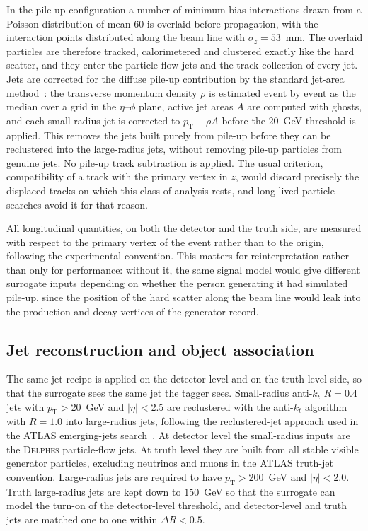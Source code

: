 \documentclass[a4paper,11pt]{article}
\newcommand{\dR}{\Delta R}
\newcommand{\pT}{p_{\mathrm{T}}}
\newcommand{\obshead}[1]{\par\medskip\noindent{\bfseries #1}\par\nobreak\smallskip}
\begin{document}
\obshead{Pile-up}

In the pile-up configuration a number of minimum-bias interactions
drawn from a Poisson distribution of mean $60$ is overlaid before
propagation, with the interaction points distributed along the beam
line with $\sigma_z = 53$~mm. The overlaid particles are therefore
tracked, calorimetered and clustered exactly like the hard scatter,
and they enter the particle-flow jets and the track collection of
every jet. Jets are corrected for the diffuse pile-up contribution by
the standard jet-area method~\cite{Cacciari:2007fd}: the transverse
momentum density $\rho$ is estimated event by event as the median over
a grid in the $\eta$--$\phi$ plane, active jet areas $A$ are computed
with ghosts, and each small-radius jet is corrected to
$\pT - \rho A$ before the $20$~GeV threshold is applied. This removes
the jets built purely from pile-up before they can be reclustered into
the large-radius jets, without removing pile-up particles from genuine
jets. No pile-up track subtraction is applied. The usual criterion,
compatibility of a track with the primary vertex in $z$, would discard
precisely the displaced tracks on which this class of analysis rests,
and long-lived-particle searches avoid it for that reason.

All longitudinal quantities, on both the detector and the truth side,
are measured with respect to the primary vertex of the event rather
than to the origin, following the experimental convention. This matters
for reinterpretation rather than only for performance: without it, the
same signal model would give different surrogate inputs depending on
whether the person generating it had simulated pile-up, since the
position of the hard scatter along the beam line would leak into the
production and decay vertices of the generator record.

\subsection{Jet reconstruction and object association}
\label{sec:jets}

The same jet recipe is applied on the detector-level and on the
truth-level side, so that the surrogate sees the same jet the tagger
sees. Small-radius anti-$k_t$ $R = 0.4$ jets with $\pT > 20$~GeV and
$|\eta| < 2.5$ are reclustered with the anti-$k_t$ algorithm with
$R = 1.0$ into large-radius jets, following the reclustered-jet
approach used in the ATLAS emerging-jets search~\cite{ATLAS:EJ}. At
detector level the small-radius inputs are the \textsc{Delphes}
particle-flow jets. At truth level they are built from all stable
visible generator particles, excluding neutrinos and muons in the
ATLAS truth-jet convention. Large-radius jets are required to have
$\pT > 200$~GeV and $|\eta| < 2.0$. Truth large-radius jets are kept
down to $150$~GeV so that the surrogate can model the turn-on of the
detector-level threshold, and detector-level and truth jets are matched
one to one within $\dR < 0.5$.
\end{document}
